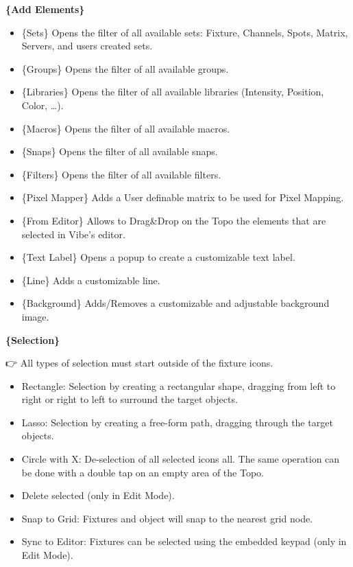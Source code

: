 \documentclass[
]{article}
\begin{document}
\textbf{\{Add Elements\}}

\begin{itemize}
\item
  \{Sets\} Opens the filter of all available sets: Fixture, Channels, Spots, Matrix, Servers, and users created sets.
\item
  \{Groups\} Opens the filter of all available groups.
\item
  \{Libraries\} Opens the filter of all available libraries (Intensity, Position, Color, \ldots).
\item
  \{Macros\} Opens the filter of all available macros.
\item
  \{Snaps\} Opens the filter of all available snaps.
\item
  \{Filters\} Opens the filter of all available filters.
\item
  \{Pixel Mapper\} Adds a User definable matrix to be used for Pixel Mapping.
\item
  \{From Editor\} Allows to Drag\&Drop on the Topo the elements that are selected in Vibe's editor.
\item
  \{Text Label\} Opens a popup to create a customizable text label.
\item
  \{Line\} Adds a customizable line.
\item
  \{Background\} Adds/Removes a customizable and adjustable background image.
\end{itemize}

\textbf{\{Selection\}}

👉 All types of selection must start outside of the fixture icons.

\begin{itemize}
\item
  Rectangle: Selection by creating a rectangular shape, dragging from left to right or right to left to surround the target objects.
\item
  Lasso: Selection by creating a free-form path, dragging through the target objects.
\item
  Circle with X: De-selection of all selected icons all. The same operation can be done with a double tap on an empty area of the Topo.
\item
  Delete selected (only in Edit Mode).
\item
  Snap to Grid: Fixtures and object will snap to the nearest grid node.
\item
  Sync to Editor: Fixtures can be selected using the embedded keypad (only in Edit Mode).
\end{itemize}
\end{document}
